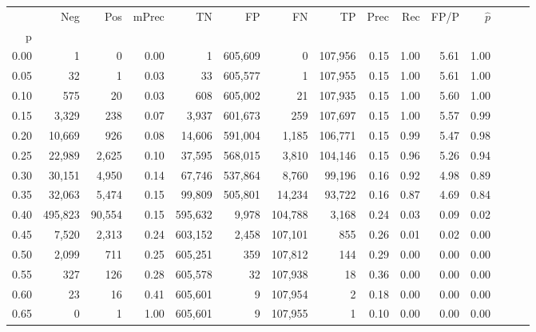 \begin{tabular}{rrrrrrrrrrrrrrr}
\toprule
{} &      Neg &     Pos & mPrec &       TN &       FP &       FN &       TP &  Prec &   Rec &  FP/P & $\hat{p}$ \\
p    &          &         &       &          &          &          &          &       &       &       &           \\
\midrule
0.00 &        1 &       0 &  0.00 &        1 &  605,609 &        0 &  107,956 &  0.15 &  1.00 &  5.61 &      1.00 \\
0.05 &       32 &       1 &  0.03 &       33 &  605,577 &        1 &  107,955 &  0.15 &  1.00 &  5.61 &      1.00 \\
0.10 &      575 &      20 &  0.03 &      608 &  605,002 &       21 &  107,935 &  0.15 &  1.00 &  5.60 &      1.00 \\
0.15 &    3,329 &     238 &  0.07 &    3,937 &  601,673 &      259 &  107,697 &  0.15 &  1.00 &  5.57 &      0.99 \\
0.20 &   10,669 &     926 &  0.08 &   14,606 &  591,004 &    1,185 &  106,771 &  0.15 &  0.99 &  5.47 &      0.98 \\
0.25 &   22,989 &   2,625 &  0.10 &   37,595 &  568,015 &    3,810 &  104,146 &  0.15 &  0.96 &  5.26 &      0.94 \\
0.30 &   30,151 &   4,950 &  0.14 &   67,746 &  537,864 &    8,760 &   99,196 &  0.16 &  0.92 &  4.98 &      0.89 \\
0.35 &   32,063 &   5,474 &  0.15 &   99,809 &  505,801 &   14,234 &   93,722 &  0.16 &  0.87 &  4.69 &      0.84 \\
0.40 &  495,823 &  90,554 &  0.15 &  595,632 &    9,978 &  104,788 &    3,168 &  0.24 &  0.03 &  0.09 &      0.02 \\
0.45 &    7,520 &   2,313 &  0.24 &  603,152 &    2,458 &  107,101 &      855 &  0.26 &  0.01 &  0.02 &      0.00 \\
0.50 &    2,099 &     711 &  0.25 &  605,251 &      359 &  107,812 &      144 &  0.29 &  0.00 &  0.00 &      0.00 \\
0.55 &      327 &     126 &  0.28 &  605,578 &       32 &  107,938 &       18 &  0.36 &  0.00 &  0.00 &      0.00 \\
0.60 &       23 &      16 &  0.41 &  605,601 &        9 &  107,954 &        2 &  0.18 &  0.00 &  0.00 &      0.00 \\
0.65 &        0 &       1 &  1.00 &  605,601 &        9 &  107,955 &        1 &  0.10 &  0.00 &  0.00 &      0.00 \\

\end{tabular}
